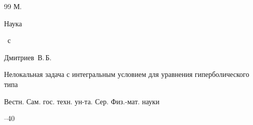 \begin{thebibliography}{99}
\publaddr М.


\publ Наука




~с










\by Дмитриев~В.\,Б.


\paper Нелокальная задача с интегральным условием для уравнения гиперболического типа


\jour Вестн. Сам. гос. техн. ун-та. Сер. Физ.-мат. науки






--40





\end{thebibliography}





\newpage







{}








\makeengtitlem


